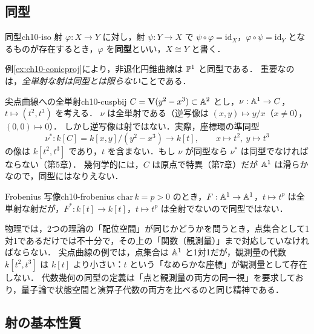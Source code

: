 \subsection{同型}

\begin{mydef}{同型}{ch10-iso}
射 $\varphi:X\to Y$ に対し，射 $\psi:Y\to X$ で $\psi\circ\varphi=\mathrm{id}_X$，$\varphi\circ\psi=\mathrm{id}_Y$ となるものが存在するとき，$\varphi$ を\textbf{同型}といい，$X\cong Y$ と書く．
\end{mydef}

例\ref{ex:ch10-conicproj}により，非退化円錐曲線は $\mathbb{P}^1$ と同型である．
重要なのは，\emph{全単射な射は同型とは限らない}ことである．

\begin{myex}{尖点曲線への全単射}{ch10-cuspbij}
$C=\mathbf{V}(y^2-x^3)\subset\mathbb{A}^2$ とし，$\nu:\mathbb{A}^1\to C$，$t\mapsto(t^2,t^3)$ を考える．
$\nu$ は全単射である（逆写像は $(x,y)\mapsto y/x$（$x\neq0$），$(0,0)\mapsto0$）．
しかし逆写像は射ではない．実際，座標環の準同型
\[
  \nu^*:k[C]=k[x,y]/(y^2-x^3)\to k[t],\qquad x\mapsto t^2,\ y\mapsto t^3
\]
の像は $k[t^2,t^3]$ であり，$t$ を含まない．もし $\nu$ が同型なら $\nu^*$ は同型でなければならない（第5章）．
幾何学的には，$C$ は原点で特異（第7章）だが $\mathbb{A}^1$ は滑らかなので，同型にはなりえない．
\end{myex}

\begin{myex}{Frobenius 写像}{ch10-frobenius}
$\mathrm{char}\,k=p>0$ のとき，$F:\mathbb{A}^1\to\mathbb{A}^1$，$t\mapsto t^p$ は全単射な射だが，$F^*:k[t]\to k[t]$，$t\mapsto t^p$ は全射でないので同型ではない．
\end{myex}

\begin{physbox}[同型と物理的同値]
物理では，2つの理論の「配位空間」が同じかどうかを問うとき，点集合として1対1であるだけでは不十分で，その上の「関数（観測量）」まで対応していなければならない．
尖点曲線の例では，点集合は $\mathbb{A}^1$ と1対1だが，観測量の代数 $k[t^2,t^3]$ は $k[t]$ より小さい：$t$ という「なめらかな座標」が観測量として存在しない．
代数幾何の同型の定義は「点と観測量の両方の同一視」を要求しており，量子論で状態空間と演算子代数の両方を比べるのと同じ精神である．
\end{physbox}

\subsection{射の基本性質}

